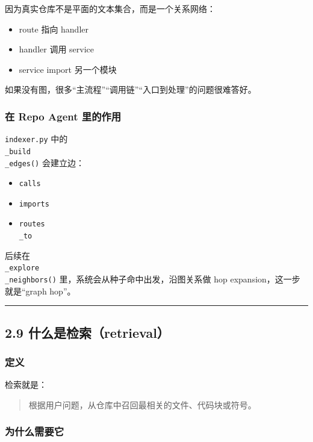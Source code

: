 \documentclass[UTF8,12pt,openany]{ctexbook}
\begin{document}
因为真实仓库不是平面的文本集合，而是一个关系网络：\par

\begin{itemize}
\item route 指向 handler
\item handler 调用 service
\item service import 另一个模块
\end{itemize}

如果没有图，很多“主流程”“调用链”“入口到处理”的问题很难答好。\par

\subsubsection{在 Repo Agent 里的作用}

\texttt{indexer.py} 中的 \texttt{\\_build\\_edges()} 会建立边：\par

\begin{itemize}
\item \texttt{calls}
\item \texttt{imports}
\item \texttt{routes\\_to}
\end{itemize}

后续在 \texttt{\\_explore\\_neighbors()} 里，系统会从种子命中出发，沿图关系做 hop expansion，这一步就是“graph hop”。\par

\hrule

\subsection{2.9 什么是检索（retrieval）}

\subsubsection{定义}

检索就是：\par

\begin{quote}
根据用户问题，从仓库中召回最相关的文件、代码块或符号。
\end{quote}

\subsubsection{为什么需要它}
\end{document}
